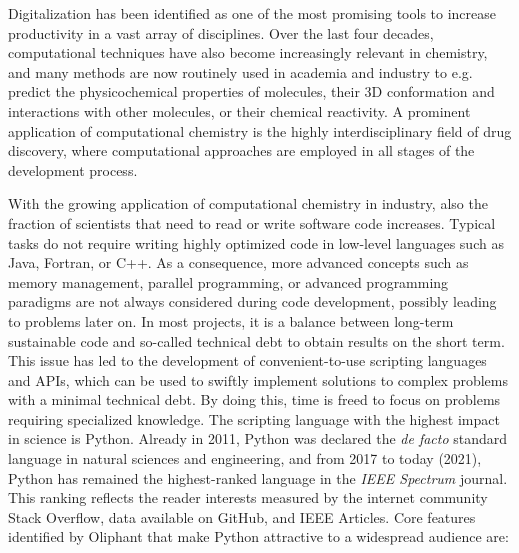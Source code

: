 Digitalization has been identified as one of the most promising tools to increase productivity in a vast array of disciplines.\cite{Tuomi2018}
Over the last four decades, computational techniques have also become increasingly relevant in chemistry, and  many methods are now routinely used in academia and industry to e.g. predict the physicochemical properties of molecules, their 3D conformation and interactions with other molecules, or their chemical reactivity. A prominent application of computational chemistry is the highly interdisciplinary field of drug discovery, where computational approaches are employed in all stages of the development process.\cite{Chodera2011, Hansen2014, Abel2017, Cournia2017, Cournia2020, Meier2021}

With the growing application of computational chemistry in industry, also the fraction of scientists that need to read or write software code increases. Typical tasks do not require writing highly optimized code in low-level languages such as Java\cite{Gosling2000}, Fortran\cite{Backus1957}, or C++\cite{Stroustrup1995}. As a consequence, more advanced concepts such as memory management, parallel programming, or advanced programming paradigms are not always considered during code development, possibly leading to problems later on. In most projects, it is a balance between long-term sustainable code and so-called technical debt\cite{Alfayez2018} to obtain results on the short term. This issue has led to the development of convenient-to-use scripting languages and APIs, which can be used to swiftly implement solutions to complex problems with a minimal technical debt. By doing this, time is freed to focus on problems requiring specialized knowledge.\cite{Ayer2014} The scripting language with the highest impact in science is Python. Already in 2011, Python was declared the \textit{de facto} standard language in natural sciences and engineering, and from 2017 to today (2021), Python has remained the highest-ranked language in the \textit{IEEE Spectrum} journal. This ranking reflects the reader interests measured by the internet community Stack Overflow, data available on GitHub, and IEEE Articles. \cite{Millman2011, Vanderwalt2011, Cass2017, Cass2018, Cass2019, Cass2020, Cass2021} 
%
Core features identified by Oliphant\cite{Oliphant2007} that make Python attractive to a widespread audience are: 
